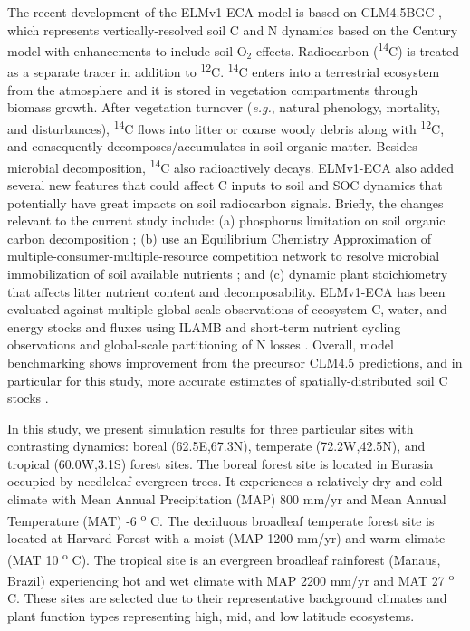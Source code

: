 \documentclass[11pt,a4paper]{article}
\begin{document}
    The recent development of the ELMv1-ECA \citep{Zhu2019} model is based on CLM4.5BGC \citep{Koven2013}, which represents vertically-resolved soil C and N dynamics based on the Century model \citep{Parton1993} with enhancements  to include soil O$_2$ effects. Radiocarbon (\textsuperscript{14}C) is treated as a separate tracer in addition to \textsuperscript{12}C. \textsuperscript{14}C enters into a terrestrial ecosystem from the atmosphere \citep{Graven2017} and it is stored in vegetation compartments through biomass growth. After vegetation turnover (\textit{e.g.}, natural phenology, mortality, and disturbances), \textsuperscript{14}C flows into litter or coarse woody debris  along with \textsuperscript{12}C, and consequently decomposes/accumulates in soil organic matter. Besides microbial decomposition, \textsuperscript{14}C also radioactively decays. ELMv1-ECA also added several new features that could affect C inputs to soil and SOC dynamics that potentially have great impacts on soil radiocarbon signals. Briefly, the changes relevant to the current study include: (a) phosphorus limitation on soil organic carbon decomposition \citep{zhu2016bg}; (b) use an Equilibrium Chemistry Approximation of multiple-consumer-multiple-resource competition network to resolve microbial immobilization of soil available nutrients \citep{Tang2013, Zhu2017ea}; and (c) dynamic plant stoichiometry that affects litter nutrient content and decomposability. ELMv1-ECA has been evaluated against multiple global-scale observations of ecosystem C, water, and energy stocks and fluxes using ILAMB \citep{Collier2018, Zhu2019} and short-term nutrient cycling observations and global-scale partitioning of N losses \citep{Zhu2015ncc, Riley2018}. Overall, model benchmarking shows improvement from the precursor CLM4.5 predictions, and in particular for this study, more accurate estimates of spatially-distributed soil C stocks \citep{Zhu2019}.
    
  In this study, we present simulation results for three particular sites with contrasting dynamics: boreal (62.5E,67.3N), temperate  (72.2W,42.5N), and tropical (60.0W,3.1S) forest sites. The boreal forest site is located in Eurasia occupied by needleleaf evergreen trees. It experiences a relatively dry and cold climate with Mean Annual Precipitation (MAP) 800 mm/yr and Mean Annual Temperature (MAT) -6 \textsuperscript{o} C. The deciduous broadleaf temperate forest site is located at Harvard Forest with a moist (MAP 1200 mm/yr) and warm climate (MAT 10 \textsuperscript{o} C). The tropical site is an evergreen broadleaf rainforest (Manaus, Brazil) experiencing hot and wet climate with MAP 2200 mm/yr and MAT 27 \textsuperscript{o} C. These sites are selected due to their representative background climates and plant function types representing high, mid, and low latitude ecosystems. 
    
\end{document}
